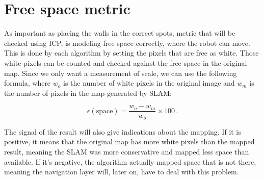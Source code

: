 \section{Free space metric} \label{sec:free_space}

As important as placing the walls in the correct spots, metric that will be checked using ICP, is modeling free space correctly, where the robot can move. This is done by each algorithm by setting the pixels that are free as white. Those white pixels can be counted and checked against the free space in the original map. Since we only want a measurement of scale, we can use the following formula, where $w_o$ is the number of white pixels in the original image and $w_m$ is the number of pixels in the map generated by SLAM:

\begin{equation}
\epsilon(\text{space}) = \frac{w_o - w_m}{w_o} \times 100 \,.
\end{equation}

The signal of the result will also give indications about the mapping. If it is positive, it means that the original map has more white pixels than the mapped result, meaning the SLAM was more conservative and mapped less space than available. If it's negative, the algorithm actually mapped space that is not there, meaning the navigation layer will, later on, have to deal with this problem.